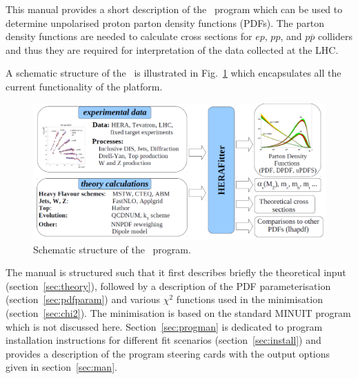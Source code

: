 \label{section:introduction}
This manual provides a short description of the \fitter\ program 
which can be used to determine unpolarised proton parton density functions 
(PDFs). 
The parton density functions are needed to calculate cross sections
for $ep$, $pp$, and $p\overline{p}$ colliders and thus they are required for interpretation
of the data collected at the LHC.

A schematic structure of the \fitter\ is illustrated in Fig.~\ref{fig:flow} which encapsulates all the current functionality of the platform.
\begin{figure}[!ht]
\begin{center}
\includegraphics[width=0.75\linewidth]{figures/flow.pdf}
\caption{Schematic structure of the \fitter\ program.}
\end{center}
\label{fig:flow}
\end{figure}

The manual is structured such that it first describes briefly the
 theoretical input (section~\ref{sec:theory}), followed by a description of the
PDF parameterisation (section~\ref{sec:pdfparam}) and various $\chi^2$ functions used in the minimisation (section~\ref{sec:chi2}). The minimisation is based on the standard MINUIT program \cite{MINUIT} which is not discussed here.
Section~\ref{sec:progman} is dedicated to program installation instructions for different fit scenarios (section~\ref{sec:install}) and provides a description of the program steering cards with the output options given in section~\ref{sec:man}.
